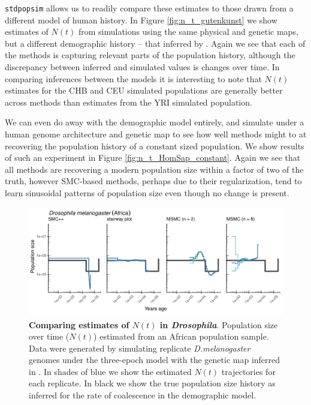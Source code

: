 \documentclass[12pt,halfline,a4paper]{ouparticle}
\newcommand{\stdpopsim}{\texttt{stdpopsim}\xspace}
\begin{document}
\stdpopsim allows us to readily compare these estimates to those drawn from a different
model of human history. In Figure \ref{fig:n_t_gutenkunst} we show estimates of
$N(t)$ from simulations using the same physical and genetic maps, but a different demographic
history -- that inferred by \cite{gutenkunst2009inferring}. Again we see that each
of the methods is capturing relevant parts of the population history, although the
discrepancy between inferred and simulated values is changes over time. In comparing inferences between the
models it is interesting to note that $N(t)$ estimates for the CHB and CEU
simulated populations are generally better across methods than estimates from the YRI
simulated population.

We can even do away with the demographic model entirely, and simulate under a human
genome architecture and genetic map to see how well methods might to at recovering
the population history of a constant sized population. We show results of such an
experiment in Figure \ref{fig:n_t_HomSap_constant}. Again we see that all methods
are recovering a modern population size within a factor of two of the truth, however
SMC-based methods, perhaps due to their regularization, tend to learn sinusoidal
patterns of population size even though no change is present.


\begin{figure}
\begin{center}
\includegraphics[width=0.8\linewidth]{display_items/d_mel_Sheehan_mask2.pdf}
\caption{\textbf{Comparing estimates of $N(t)$ in \emph{Drosophila}}. Population
size over time ($N(t)$) estimated from an African population sample. Data were generated by simulating
replicate \emph{D.melanogaster} genomes under the three-epoch \cite{sheehan2016deep} model
with the genetic map inferred in \cite{comeron2012many}. In shades of blue we show the estimated
$N(t)$ trajectories for each replicate. In black we show the true population size history as inferred
for the rate of coalescence in the demographic model.}
\label{fig:n_t_sheehan}
\end{center}
\end{figure}
\end{document}
